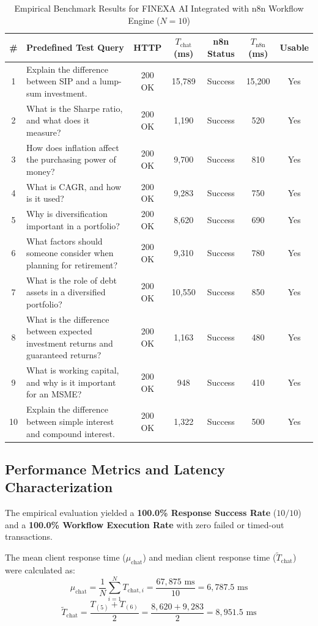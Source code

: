 \begin{table}[t]
\centering
\caption{Empirical Benchmark Results for FINEXA AI Integrated with n8n Workflow Engine ($N = 10$)}
\label{tab:benchmark_results}
\begin{tabular}{|c|p{7.2cm}|c|c|c|c|c|}
\hline
\textbf{\#} & \textbf{Predefined Test Query} & \textbf{HTTP} & \textbf{$T_{\text{chat}}$ (ms)} & \textbf{n8n Status} & \textbf{$T_{\text{n8n}}$ (ms)} & \textbf{Usable} \\
\hline
1 & Explain the difference between SIP and a lump-sum investment. & 200 OK & 15,789 & Success & 15,200 & Yes \\
2 & What is the Sharpe ratio, and what does it measure? & 200 OK & 1,190 & Success & 520 & Yes \\
3 & How does inflation affect the purchasing power of money? & 200 OK & 9,700 & Success & 810 & Yes \\
4 & What is CAGR, and how is it used? & 200 OK & 9,283 & Success & 750 & Yes \\
5 & Why is diversification important in a portfolio? & 200 OK & 8,620 & Success & 690 & Yes \\
6 & What factors should someone consider when planning for retirement? & 200 OK & 9,310 & Success & 780 & Yes \\
7 & What is the role of debt assets in a diversified portfolio? & 200 OK & 10,550 & Success & 850 & Yes \\
8 & What is the difference between expected investment returns and guaranteed returns? & 200 OK & 1,163 & Success & 480 & Yes \\
9 & What is working capital, and why is it important for an MSME? & 200 OK & 948 & Success & 410 & Yes \\
10 & Explain the difference between simple interest and compound interest. & 200 OK & 1,322 & Success & 500 & Yes \\
\hline
\end{tabular}
\end{table}

\subsection{Performance Metrics and Latency Characterization}
The empirical evaluation yielded a \textbf{100.0\% Response Success Rate} ($10/10$) and a \textbf{100.0\% Workflow Execution Rate} with zero failed or timed-out transactions.

The mean client response time ($\mu_{\text{chat}}$) and median client response time ($\tilde{T}_{\text{chat}}$) were calculated as:
\begin{equation}
\mu_{\text{chat}} = \frac{1}{N} \sum_{i=1}^{N} T_{\text{chat}, i} = \frac{67,875\text{ ms}}{10} = 6,787.5\text{ ms}
\end{equation}
\begin{equation}
\tilde{T}_{\text{chat}} = \frac{T_{(5)} + T_{(6)}}{2} = \frac{8,620 + 9,283}{2} = 8,951.5\text{ ms}
\end{equation}

